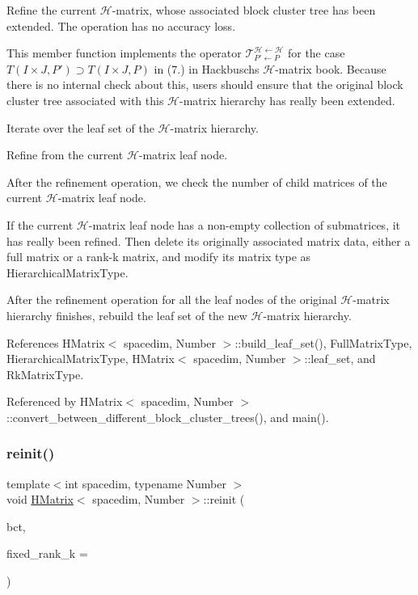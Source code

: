 Refine the current $\mathcal{H}$-\/matrix, whose associated block cluster tree has been extended. The operation has no accuracy loss.

This member function implements the operator $\mathcal{T}_{P' \leftarrow P}^{\mathcal{H} \leftarrow \mathcal{H}}$ for the case $T(I \times J, P') \supset T(I \times J, P)$ in (7.) in Hackbusch\textquotesingle{}s $\mathcal{H}$-\/matrix book. Because there is no internal check about this, users should ensure that the original block cluster tree associated with this $\mathcal{H}$-\/matrix hierarchy has really been extended. 
\begin{DoxyDescription}
\item[Work flow ]

Iterate over the leaf set of the $\mathcal{H}$-\/matrix hierarchy.

Refine from the current $\mathcal{H}$-\/matrix leaf node.

After the refinement operation, we check the number of child matrices of the current $\mathcal{H}$-\/matrix leaf node.

If the current $\mathcal{H}$-\/matrix leaf node has a non-\/empty collection of submatrices, it has really been refined. Then delete its originally associated matrix data, either a full matrix or a rank-\/k matrix, and modify its matrix type as {\ttfamily Hierarchical\+Matrix\+Type}.

After the refinement operation for all the leaf nodes of the original $\mathcal{H}$-\/matrix hierarchy finishes, rebuild the leaf set of the new $\mathcal{H}$-\/matrix hierarchy.


\end{DoxyDescription}

References H\+Matrix$<$ spacedim, Number $>$\+::build\+\_\+leaf\+\_\+set(), Full\+Matrix\+Type, Hierarchical\+Matrix\+Type, H\+Matrix$<$ spacedim, Number $>$\+::leaf\+\_\+set, and Rk\+Matrix\+Type.



Referenced by H\+Matrix$<$ spacedim, Number $>$\+::convert\+\_\+between\+\_\+different\+\_\+block\+\_\+cluster\+\_\+trees(), and main().

\mbox{\label{classHMatrix_a83f804163e1695cfb952ddb6b0df2503}} 
\subsubsection{\texorpdfstring{reinit()}{reinit()}\hspace{0.1cm}{\footnotesize\ttfamily [1/2]}}
{\footnotesize\ttfamily template$<$int spacedim, typename Number $>$ \\
void \hyperlink{classHMatrix}{H\+Matrix}$<$ spacedim, Number $>$\+::reinit (\begin{DoxyParamCaption}\item[{const \hyperlink{classBlockClusterTree}{Block\+Cluster\+Tree}$<$ spacedim, Number $>$ \&}]{bct,  }\item[{const unsigned int}]{fixed\+\_\+rank\+\_\+k = {} }\end{DoxyParamCaption})}

